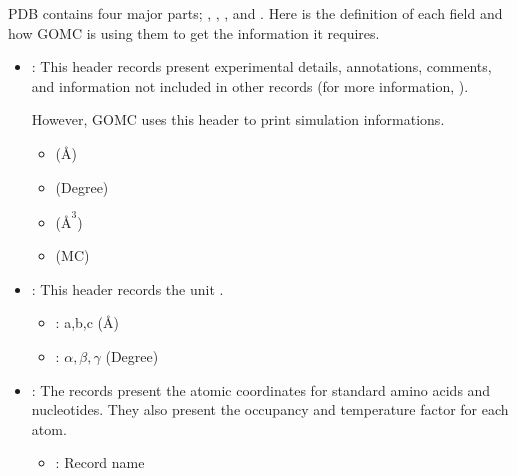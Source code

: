 \documentclass[letterpaper,10pt,english]{sphinxmanual}
\begin{document}
PDB contains four major parts; , , , and . Here is the definition of each field and how GOMC is using them to get the information it requires.
\begin{itemize}
\item {} 
:
This header records present experimental  details, annotations, comments, and information not included in other records (for more information,
).

However, GOMC uses this header to print simulation informations.
\begin{itemize}
\item {} 
 (Å)

\item {} 
 (Degree)

\item {} 
 (\(Å^3\))

\item {} 
 (MC)

\end{itemize}

\item {} 
:
This header records the unit .
\begin{itemize}
\item {} 
: a,b,c (Å)

\item {} 
: \(\alpha, \beta, \gamma\) (Degree)

\end{itemize}

\item {} 
:
The  records present the atomic coordinates for standard amino acids
and nucleotides. They also present the occupancy and temperature factor for each atom.
\begin{itemize}
\item {} 
: Record name


\end{itemize}
\end{itemize}
\end{document}
